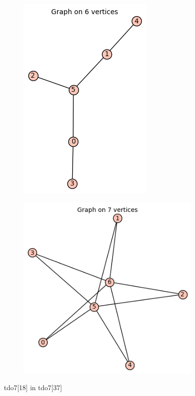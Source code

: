 \documentclass[12pt, a4paper]{article}
\begin{document}
\begin{center}
\begin{figure}[!htb]
\centering
\begin{subfigure}{0.5\textwidth}
  \centering
  \includegraphics[width=0.35\linewidth]{tdo7[18]}
\end{subfigure}%
\begin{subfigure}{0.5\textwidth}
  \centering
  \includegraphics[width=0.5\linewidth]{tdo7[37]}
\end{subfigure}
\caption{tdo7[18] in tdo7[37]}
\label{fig:test}
\end{figure}


\end{center}
\end{document}
